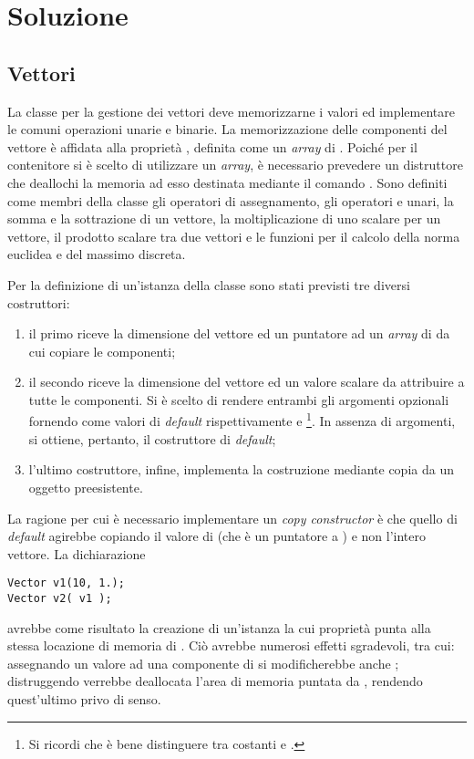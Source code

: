 \newpage

\section*{Soluzione}

\subsection*{Vettori}
La classe per la gestione dei vettori deve memorizzarne i valori ed
implementare le comuni operazioni unarie e binarie. La memorizzazione
delle componenti del vettore \`e affidata alla propriet\`a
, definita come un \textit{array} di
. Poich\'e per il contenitore si \`e scelto di utilizzare
un \emph{array}, \`e necessario prevedere un distruttore che deallochi
la memoria ad esso destinata mediante il comando .
Sono definiti come membri della classe  gli
operatori di assegnamento, gli operatori \cpp{+} e \cpp{-} unari, la
somma e la sottrazione di un vettore, la moltiplicazione di uno
scalare per un vettore, il prodotto scalare tra due vettori e le
funzioni per il calcolo della norma euclidea e del massimo discreta.

Per la definizione di un'istanza della classe  sono stati
previsti tre diversi costruttori:
\begin{enumerate}
\item il primo riceve la dimensione del vettore ed un puntatore ad un
\emph{array} di  da cui copiare le componenti;
\item il secondo riceve la dimensione del vettore ed un valore scalare
  da attribuire a tutte le componenti. Si \`e scelto di rendere
  entrambi gli argomenti opzionali fornendo come valori di
  \emph{default} rispettivamente  e \footnote{Si
    ricordi che \`e bene distinguere tra costanti  e
  .}. In assenza di argomenti, si ottiene, pertanto, il
  costruttore di \emph{default};
\item l'ultimo costruttore, infine, implementa la costruzione mediante
  copia da un oggetto  preesistente.
\end{enumerate}

La ragione per cui \`e necessario implementare un \emph{copy
  constructor} \`e che quello di \emph{default} agirebbe copiando il
valore di  (che \`e un puntatore a ) e non
  l'intero vettore. La dichiarazione
\begin{lstlisting}
Vector v1(10, 1.);
Vector v2( v1 );
\end{lstlisting}
avrebbe come risultato la creazione di un'istanza  la cui
propriet\`a  punta alla stessa locazione di memoria di
. Ci\`o avrebbe numerosi effetti sgradevoli, tra cui:
assegnando un valore ad una componente di  si modificherebbe
anche ; distruggendo  verrebbe deallocata l'area di
memoria puntata da , rendendo quest'ultimo privo di senso.

